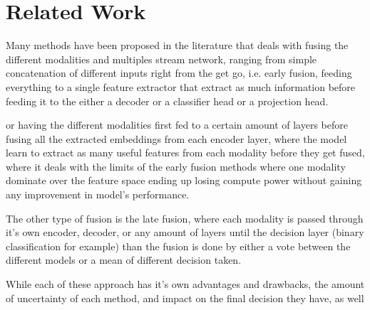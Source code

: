 \section{Related Work}

Many methods have been proposed in the literature that deals with fusing the different modalities and multiples stream network, ranging from simple concatenation of different inputs right from the get go, i.e. early fusion, feeding everything to a single feature extractor that extract as much information before feeding it to the either a decoder or a classifier head or a projection head.

or having the different modalities first fed to a certain amount of layers before fusing all the extracted embeddings from each encoder layer, where the model learn to extract as many useful features from each modality before they get fused, where it deals with the limits of the early fusion methods where one modality dominate over the feature space ending up losing compute power without gaining any improvement in model's performance.

The other type of fusion is the late fusion, where each modality is passed through it's own encoder, decoder, or any amount of layers until the decision layer (binary classification for example) than the fusion is done by either a vote between the different models or a mean of different decision taken.

While each of these approach has it's own advantages and drawbacks, the amount of uncertainty of each method, and impact on the final decision they have, as well
